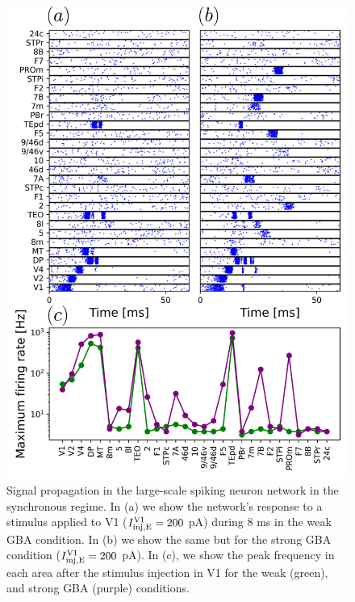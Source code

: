 \begin{figure}[!ht]
 \centering
     \includegraphics[scale=0.6]{figures/figure5.pdf}
 \caption{Signal propagation in the large-scale spiking neuron network in the synchronous regime. In (a) we show the network's response to a stimulus applied to V1 ($I_{\rm inj, E}^{\rm V1} = 200$ pA) during $8$ ms in the weak GBA condition. In (b) we show the same but for the strong GBA condition  ($I_{\rm inj, E}^{\rm V1} = 200$ pA). In (c), we show the peak frequency in each area after the stimulus injection in V1 for the weak (green), and strong GBA (purple) conditions. }\label{fig:fig4}
\end{figure}

